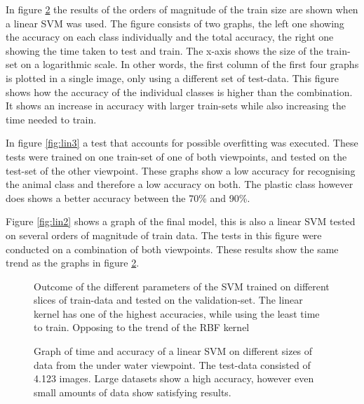 In figure \ref{fig:lin1} the results of the orders of magnitude of the train size are shown when a linear SVM was used. The figure consists of two graphs, the left one showing the accuracy on each class individually and the total accuracy, the right one showing the time taken to test and train. The x-axis shows the size of the train-set on a logarithmic scale.
In other words, the first column of the first four graphs is plotted in a single image, only using a different set of test-data.
This figure shows how the accuracy of the individual classes is higher than the combination. It shows an increase in accuracy with larger train-sets while also increasing the time needed to train.

\ifx\showmixi\undefined
In figure \ref{fig:lin3} a test that accounts for possible overfitting was executed. These tests were trained on one train-set of one of both viewpoints, and tested on the test-set of the other viewpoint. These graphs show a low accuracy for recognising the animal class and therefore a low accuracy on both. The plastic class however does shows a better accuracy between the 70\% and 90\%.
\fi

Figure \ref{fig:lin2} shows a graph of the final model, this is also a linear SVM tested on several orders of magnitude of train data.
The tests in this figure were conducted on a combination of both viewpoints.
These results show the same trend as the graphs in figure \ref{fig:lin1}.

\begin{figure}%
\centering
\ifx\showfig\undefined

\vspace{-.2cm}

\vspace{-.2cm}

\vspace{-.2cm}
 \fi
\caption{Outcome of the different parameters of the SVM trained on different slices of train-data and tested on the validation-set. The linear kernel has one of the highest accuracies, while using the least time to train. Opposing to the trend of the RBF kernel}
\label{fig:c14}
\end{figure}


\begin{figure}%
\centering
\ifx\showfig\undefined
 \fi
\caption{Graph of time and accuracy of a linear SVM on different sizes of data from the under water viewpoint. The test-data consisted of 4.123 images. Large datasets show a high accuracy, however even small amounts of data show satisfying results.}
\label{fig:lin1}
\end{figure}

